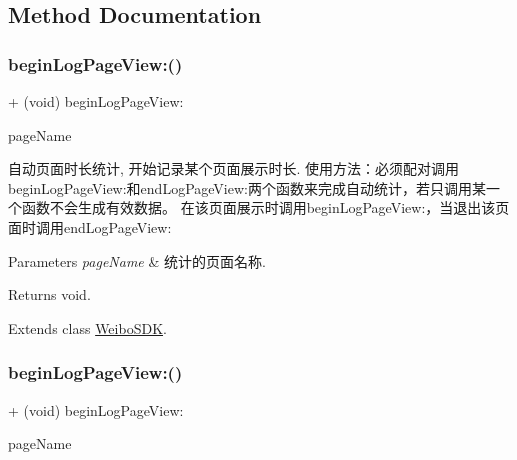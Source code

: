 \subsection{Method Documentation}
\mbox{\label{category_weibo_s_d_k_07_statistics_08_ae9b18093f71e740c51f254fb517e818d}} 
\subsubsection{\texorpdfstring{begin\+Log\+Page\+View\+:()}{beginLogPageView:()}\hspace{0.1cm}{\footnotesize\ttfamily [1/3]}}
{\footnotesize\ttfamily + (void) begin\+Log\+Page\+View\+: \begin{DoxyParamCaption}\item[{(N\+S\+String $\ast$)}]{page\+Name }\end{DoxyParamCaption}}

自动页面时长统计, 开始记录某个页面展示时长. 使用方法：必须配对调用begin\+Log\+Page\+View\+:和end\+Log\+Page\+View\+:两个函数来完成自动统计，若只调用某一个函数不会生成有效数据。 在该页面展示时调用begin\+Log\+Page\+View\+:，当退出该页面时调用end\+Log\+Page\+View\+: 
\begin{DoxyParams}{Parameters}
{\em page\+Name} & 统计的页面名称. \\
\hline
\end{DoxyParams}
\begin{DoxyReturn}{Returns}
void. 
\end{DoxyReturn}


Extends class \mbox{\hyperlink{interface_weibo_s_d_k_ae9b18093f71e740c51f254fb517e818d}{Weibo\+S\+DK}}.

\mbox{\label{category_weibo_s_d_k_07_statistics_08_ae9b18093f71e740c51f254fb517e818d}} 
\subsubsection{\texorpdfstring{begin\+Log\+Page\+View\+:()}{beginLogPageView:()}\hspace{0.1cm}{\footnotesize\ttfamily [2/3]}}
{\footnotesize\ttfamily + (void) begin\+Log\+Page\+View\+: \begin{DoxyParamCaption}\item[{(N\+S\+String $\ast$)}]{page\+Name }\end{DoxyParamCaption}}

